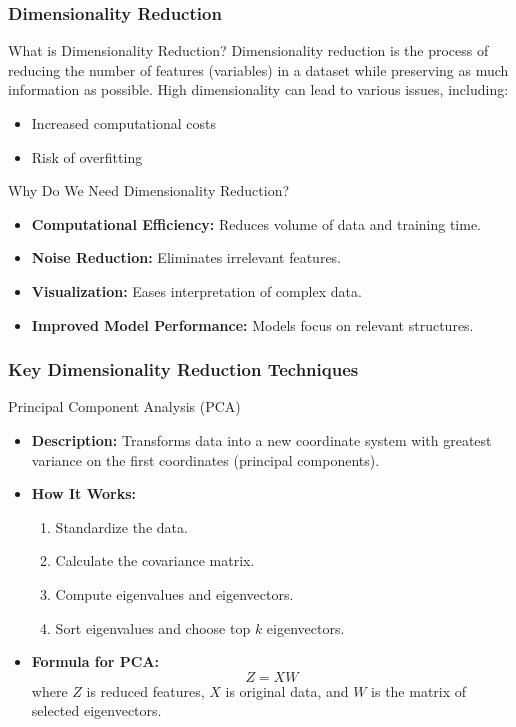 \documentclass[aspectratio=169]{beamer}
\begin{document}
\begin{frame}[fragile]
    \frametitle{Dimensionality Reduction}
    \begin{block}{What is Dimensionality Reduction?}
        Dimensionality reduction is the process of reducing the number of features (variables) in a dataset while preserving as much information as possible. High dimensionality can lead to various issues, including:
        \begin{itemize}
            \item Increased computational costs
            \item Risk of overfitting
        \end{itemize}
    \end{block}
    
    \begin{block}{Why Do We Need Dimensionality Reduction?}
        \begin{itemize}
            \item \textbf{Computational Efficiency:} Reduces volume of data and training time.
            \item \textbf{Noise Reduction:} Eliminates irrelevant features.
            \item \textbf{Visualization:} Eases interpretation of complex data.
            \item \textbf{Improved Model Performance:} Models focus on relevant structures.
        \end{itemize}
    \end{block}
\end{frame}

\begin{frame}[fragile]
    \frametitle{Key Dimensionality Reduction Techniques}
    \begin{block}{Principal Component Analysis (PCA)}
        \begin{itemize}
            \item \textbf{Description:} Transforms data into a new coordinate system with greatest variance on the first coordinates (principal components).
            \item \textbf{How It Works:}
            \begin{enumerate}
                \item Standardize the data.
                \item Calculate the covariance matrix.
                \item Compute eigenvalues and eigenvectors.
                \item Sort eigenvalues and choose top \(k\) eigenvectors.
            \end{enumerate}
            \item \textbf{Formula for PCA:}
            \begin{equation}
                Z = X W
            \end{equation}
            where \(Z\) is reduced features, \(X\) is original data, and \(W\) is the matrix of selected eigenvectors.
        \end{itemize}
    \end{block}
\end{frame}
\end{document}
